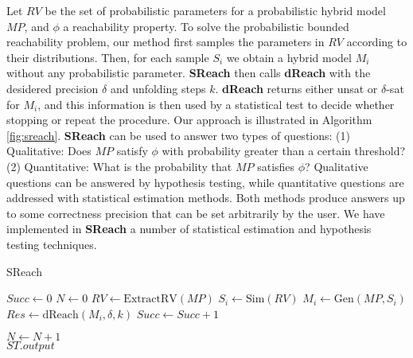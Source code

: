 Let $RV$ be the set of probabilistic parameters for a probabilistic hybrid model $MP$, and $\phi$ a reachability
property. To solve the 
probabilistic bounded reachability problem, our method first samples the parameters in $RV$ according 
to their distributions. Then, for each sample $S_i$ we obtain a hybrid model $M_i$ without any probabilistic 
parameter. {\bf SReach} then calls {\bf dReach} \cite{gaodelta} with the desidered precision $\delta$ and 
unfolding steps $k$. {\bf dReach} returns either unsat or $\delta$-sat for $M_i$, and this information
is then used by a statistical test to decide whether stopping or repeat the procedure.
Our approach is illustrated in Algorithm \ref{fig:sreach}.
{\bf SReach} can be used to answer two types of questions: (1) Qualitative: Does $MP$ satisfy $\phi$ with probability
greater than a certain threshold? (2) Quantitative: What is the probability that $MP$ satisfies $\phi$?
Qualitative questions can be answered by hypothesis testing, while quantitative questions are addressed with
statistical estimation methods. Both methods produce answers up to some correctness 
precision that can be set arbitrarily by the user.
We have implemented in {\bf SReach} a number of statistical estimation and hypothesis testing techniques.

 

\begin{algorithm}
  \centering
  \caption{SReach}
  \label{fig:sreach}
  \begin{algorithmic}[1]
        \State $Succ \gets 0$	
        \State $N \gets 0$	
        \State $RV \gets \mathrm{ExtractRV}(MP)$	
        \Repeat
            \State $S_i \gets \mathrm{Sim}(RV)$		
            \State $M_i \gets \mathrm{Gen}(MP, S_i)$	
            \State $Res \gets \mathrm{dReach}(M_i, \delta, k)$	
		\State $Succ \gets Succ + 1$
	    
	  \EndIf
	\State $N \gets N + 1$
        	\\
	\quad\hspace{0.5ex} \Return $ST.output$
   \EndFunction
  \end{algorithmic}
\end{algorithm}

